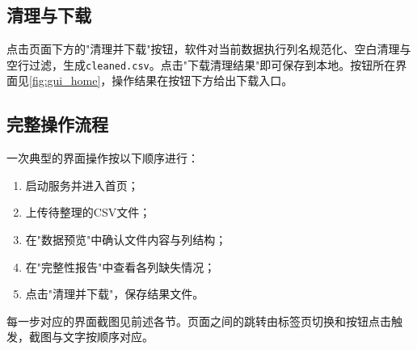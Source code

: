 \subsection{清理与下载}
\label{ssec:gui_clean}
点击页面下方的"清理并下载"按钮，软件对当前数据执行列名规范化、空白清理与空行过滤，生成\lstinline|cleaned.csv|。点击"下载清理结果"即可保存到本地。按钮所在界面见\ref{fig:gui_home}，操作结果在按钮下方给出下载入口。

\subsection{完整操作流程}
\label{ssec:gui_flow}
一次典型的界面操作按以下顺序进行：
\begin{enumerate}
    \item 启动服务并进入首页；
    \item 上传待整理的CSV文件；
    \item 在"数据预览"中确认文件内容与列结构；
    \item 在"完整性报告"中查看各列缺失情况；
    \item 点击"清理并下载"，保存结果文件。
\end{enumerate}
每一步对应的界面截图见前述各节。页面之间的跳转由标签页切换和按钮点击触发，截图与文字按顺序对应。
